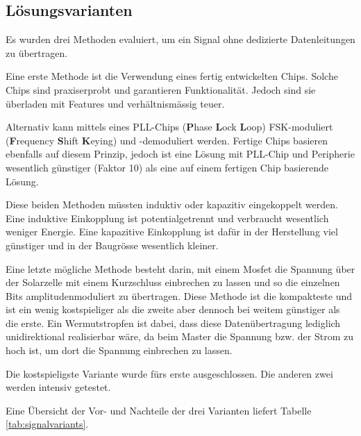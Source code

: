 \subsection{L\"osungsvarianten}
\label{subsec:losungsvarianten}

Es   wurden  drei   Methoden  evaluiert,   um  ein   Signal  ohne   dedizierte
Datenleitungen zu \"ubertragen.

Eine erste Methode ist die Verwendung eines fertig entwickelten Chips.  Solche
Chips sind  praxiserprobt und  garantieren Funktionalit\"at.  Jedoch  sind sie
\"uberladen mit Features und verh\"altnism\"assig teuer.

Alternativ   kann  mittels   eines  PLL-Chips   (\textbf{P}hase  \textbf{L}ock
\textbf{L}oop)      FSK-moduliert      (\textbf{F}requency      \textbf{S}hift
\textbf{K}eying)  und -demoduliert  werden. Fertige  Chips basieren  ebenfalls
auf  diesem Prinzip,  jedoch ist  eine  L\"osung mit  PLL-Chip und  Peripherie
wesentlich g\"unstiger (Faktor 10) als eine auf einem fertigen Chip basierende
L\"osung.

Diese  beiden   Methoden  m\"ussten   induktiv  oder   kapazitiv  eingekoppelt
werden. Eine  induktive  Einkopplung   ist  potentialgetrennt  und  verbraucht
wesentlich  weniger Energie. Eine  kapazitive Einkopplung  ist daf\"ur  in der
Herstellung viel g\"unstiger und in der Baugr\"osse wesentlich kleiner.

\newpage
Eine letzte  m\"ogliche Methode besteht  darin, mit einem Mosfet  die Spannung
\"uber der  Solarzelle mit einem Kurzschluss  einbrechen zu lassen und  so die
einzelnen  Bits amplitudenmoduliert  zu  \"ubertragen. Diese  Methode ist  die
kompakteste und  ist ein wenig kostspieliger  als die zweite aber  dennoch bei
weitem g\"unstiger  als die  erste. Ein Wermutstropfen  ist dabei,  dass diese
Daten\"ubertragung  lediglich  unidirektional  realisierbar  w\"are,  da  beim
Master  die  Spannung  bzw. der  Strom  zu  hoch  ist,  um dort  die  Spannung
einbrechen zu lassen.

Die  kostspieligste Variante  wurde f\"urs  erste ausgeschlossen. Die  anderen
zwei werden intensiv getestet.

Eine \"Ubersicht  der Vor-  und Nachteile der  drei Varianten  liefert Tabelle
\ref{tab:signalvariants}.

